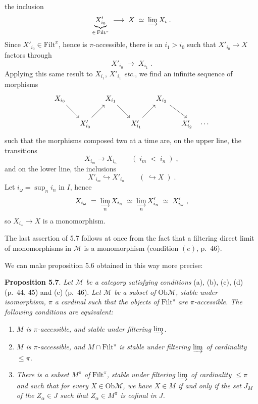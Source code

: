 \documentclass[11pt]{article}
\newcommand{\printedpage}[1]{\marginpar{\footnotesize p.~#1}}
\newcommand{\msp}[1]{\marginpar{\footnotesize [#1]}}
\newcommand{\Filt}{\mathrm{Filt}}
\newcommand{\Ob}{\mathrm{Ob}}
\newcommand{\M}{\mathcal{M}}
\begin{document}
\printedpage{34}
the inclusion
\[
\underbrace{X'_{i_0}}_{\in\, \Filt^\pi} \;\longrightarrow\; X \;\simeq\; \varinjlim X_i \;.
\]
Since $X'_{i_0} \in \Filt^\pi$, hence is $\pi$-accessible, there is an $i_1 > i_0$ such that $X'_{i_0} \longrightarrow X$ factors through
\[
X'_{i_0} \;\longrightarrow\; X_{i_1} \;.
\]
Applying this same result to $X_{i_1}$, $X'_{i_1}$ \textit{etc.}, we find an infinite sequence of morphisms
\[
\begin{tikzcd}[column sep=small]
X_{i_0} \arrow[dr] & & X_{i_1} \arrow[dr] & & X_{i_2} \arrow[dr] & \\
& X'_{i_0} \arrow[ur] & & X'_{i_1} \arrow[ur] & & X'_{i_2} \quad \cdots
\end{tikzcd}
\]
such that the morphisms composed two at a time are, on the upper line, the transitions
\[
X_{i_m} \longrightarrow X_{i_n} \qquad (\; i_m \;<\; i_n \;) \;,
\]
and on the lower line, the inclusions
\[
X'_{i_m} \hookrightarrow X'_{i_n} \qquad (\; \hookrightarrow X \;) \;.
\]
Let $i_\omega = \sup_n i_n$ in $I$, hence
\[
X_{i_\omega} \;=\; \varinjlim_{n} X_{i_n} \;\simeq\; \varinjlim_{n} X'_{i_n} \;\simeq\; X'_{i_\omega} \;,
\]
so $X_{i_\omega} \longrightarrow X$ is a monomorphism.

\msp{page 57}

The last assertion of 5.7 follows at once from the fact that a filtering direct limit of monomorphisms in $\M$ is a monomorphism (condition $(e)$, p.~46).

We can make proposition 5.6 obtained in this way more precise:

\textbf{Proposition 5.7}. \textit{Let $\M$ be a category satisfying conditions} (a), (b), (c), (d) (p.~44, 45) and (e) (p.~46). \textit{Let $\M$ be a subset of} $\Ob\M$\textit{, stable under isomorphism, $\pi$ a cardinal such that the objects of} $\Filt^\pi$ \textit{are $\pi$-accessible. The following conditions are equivalent:} %

\begin{enumerate}[label={}]
\item[a)] \textit{$M$ is $\pi$-accessible, and stable under filtering $\varinjlim$.}
\item[b)] \textit{$M$ is $\pi$-accessible, and $M \cap \Filt^\pi$ is stable under filtering $\varinjlim$ of cardinality $\leq \pi$.}
\item[c)] \textit{There is a subset $M^\pi$ of} $\Filt^\pi$\textit{, stable under filtering $\varinjlim$ of cardinality $\leq \pi$ and such that for every $X \in \Ob\M$, we have $X \in M$ if and only if the set $J_M$ of the $Z_\alpha \in J$ such that $Z_\alpha \in M^\pi$ is cofinal in $J$.}
\end{enumerate}
\end{document}
